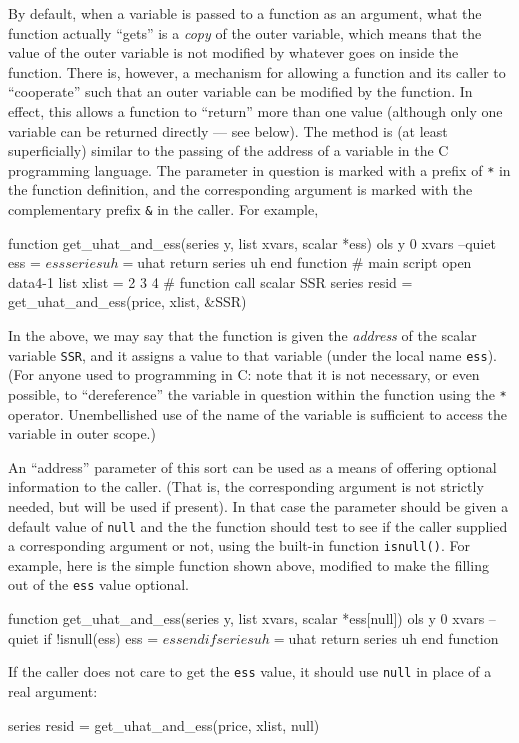 By default, when a variable is passed to a function as an argument,
what the function actually ``gets'' is a \emph{copy} of the outer
variable, which means that the value of the outer variable is not
modified by whatever goes on inside the function.  There is, however,
a mechanism for allowing a function and its caller to ``cooperate''
such that an outer variable can be modified by the function.  In
effect, this allows a function to ``return'' more than one value
(although only one variable can be returned directly --- see below).
The method is (at least superficially) similar to the passing of the
address of a variable in the C programming language.  The parameter in
question is marked with a prefix of \texttt{*} in the function
definition, and the corresponding argument is marked with the
complementary prefix \verb+&+ in the caller.  For example,
%
\begin{code}
function get_uhat_and_ess(series y, list xvars, scalar *ess)
  ols y 0 xvars --quiet
  ess = $ess
  series uh = $uhat
  return series uh
end function
# main script
open data4-1
list xlist = 2 3 4
# function call
scalar SSR
series resid = get_uhat_and_ess(price, xlist, &SSR)
\end{code}
%
In the above, we may say that the function is given the \emph{address}
of the scalar variable \texttt{SSR}, and it assigns a value to that
variable (under the local name \texttt{ess}).  (For anyone used to
programming in C: note that it is not necessary, or even possible, to
``dereference'' the variable in question within the function using the
\texttt{*} operator.  Unembellished use of the name of the variable is
sufficient to access the variable in outer scope.)

An ``address'' parameter of this sort can be used as a means of
offering optional information to the caller.  (That is, the
corresponding argument is not strictly needed, but will be used if
present).  In that case the parameter should be given a default value
of \texttt{null} and the the function should test to see if the caller
supplied a corresponding argument or not, using the built-in function
\texttt{isnull()}.  For example, here is the simple function shown
above, modified to make the filling out of the \texttt{ess} value
optional.
%
\begin{code}
function get_uhat_and_ess(series y, list xvars, scalar *ess[null])
  ols y 0 xvars --quiet
  if !isnull(ess) 
     ess = $ess
  endif
  series uh = $uhat
  return series uh
end function
\end{code}
%
If the caller does not care to get the \texttt{ess} value, it should
use \texttt{null} in place of a real argument:
%
\begin{code}
series resid = get_uhat_and_ess(price, xlist, null)
\end{code}

